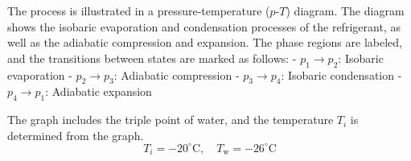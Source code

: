 The process is illustrated in a pressure-temperature (\(p\)-\(T\)) diagram. The diagram shows the isobaric evaporation and condensation processes of the refrigerant, as well as the adiabatic compression and expansion. The phase regions are labeled, and the transitions between states are marked as follows:  
- \(p_1 \to p_2\): Isobaric evaporation  
- \(p_2 \to p_3\): Adiabatic compression  
- \(p_3 \to p_4\): Isobaric condensation  
- \(p_4 \to p_1\): Adiabatic expansion  

The graph includes the triple point of water, and the temperature \(T_i\) is determined from the graph.  
\[
T_i = -20^\circ\text{C}, \quad T_{\text{w}} = -26^\circ\text{C}
\]